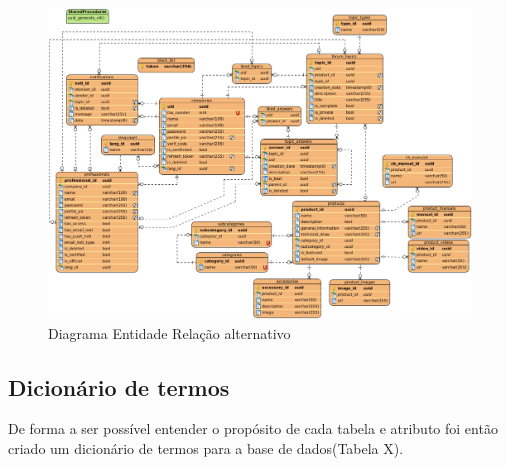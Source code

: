 \begin{figure}[htb]
    \centering
    
    \includegraphics[width=\textwidth]{images/diagramas/diagrama_bd_alt.png}
    \caption{Diagrama Entidade Relação alternativo}
    \label{fig:21}
\end{figure}

\newpage

\subsection{Dicionário de termos}

De forma a ser possível entender o propósito de cada tabela e atributo 
foi então criado um dicionário de termos para a base de dados(Tabela X).


